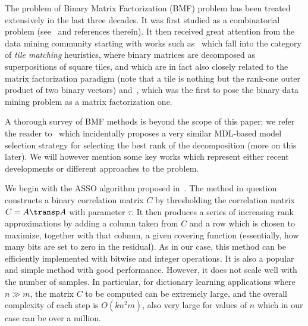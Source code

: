 \documentclass[twocolumn]{IEEEtran}
\begin{document}
%
The problem of Binary Matrix Factorization (BMF) problem has been treated extensively in the last three decades. It was first studied as a combinatorial problem (see~\cite{monson95} and references therein). It then received great attention from the data mining community starting with works such as~\cite{proximus,tiling} which fall into the category of \emph{tile matching} heuristics, where binary matrices are decomposed as superpositions of square tiles, and which are in fact also closely related to  the matrix factorization paradigm (note that a tile is nothing but the rank-one outer product of two binary vectors) and~\cite{asso}, which was the first to pose the binary data mining problem as a matrix factorization one.

A thorough survey of BMF methods is beyond the scope of this paper; we refer the reader to~\cite{bmf-mdl} which incidentally proposes a very similar MDL-based model selection strategy for selecting the best rank of the decomposition (more on this later). We will however mention some key works which represent either recent developments or different approaches to the problem.

We begin with the ASSO algorithm proposed in~\cite{asso}. The method in question constructs a binary correlation matrix $C$ by thresholding the correlation matrix $C=A{\transp}A$ with parameter $\tau$. It then produces a series of increasing rank approximations by adding a column taken from $C$ and a row which is chosen to maximize, together with that column, a given covering function (essentially, how many bits are set to zero in the residual). As in our case, this method can be efficiently implemented with bitwise and integer operations. It is also a popular and simple method with good performance. However, it does not scale well with the number of samples. In particular, for dictionary learning applications where $n \gg m$, the matrix $C$ to be computed can be extremely large, and the overall complexity of each step is $O(kn^2m)$, also very large for values of $n$ which in our case can be over a million.
\end{document}
